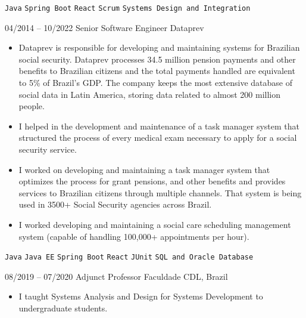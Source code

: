 \begin{entrylist}
{\begin{itemize}[noitemsep,topsep=0pt,parsep=0pt,partopsep=0pt, leftmargin=-1pt]
                \end{itemize} 
                \texttt{Java} \slashsep \texttt{Spring Boot} \slashsep \texttt{React} \slashsep \texttt{Scrum} \slashsep \texttt{Systems Design and Integration} 
        }

	\entry
        {04/2014 -- 10/2022}
		{Senior Software Engineer}
		{Dataprev}
		{
                \vspace{-10pt}
                \begin{itemize}[noitemsep,topsep=0pt,parsep=0pt,partopsep=0pt, leftmargin=-1pt]
                    \item Dataprev is responsible for developing and maintaining systems for Brazilian social security. Dataprev processes 34.5 million pension payments and other benefits to Brazilian citizens and the total payments handled are equivalent to 5\% of Brazil's GDP. The company keeps the most extensive database of social data in Latin America, storing data related to almost 200 million people.
                    \item I helped in the development and maintenance of a task manager system that structured the process of every medical exam necessary to apply for a social security service. 
                    \item I worked on developing and maintaining a task manager system that optimizes the process for grant pensions, and other benefits and provides services to Brazilian citizens through multiple channels. That system is being used in 3500+ Social Security agencies across Brazil. 
                    \item I worked developing and maintaining a social care scheduling management system (capable of handling 100,000+ appointments per hour).

                \end{itemize} 
                \texttt{Java} \slashsep \texttt{Java EE}  \slashsep \texttt{Spring Boot} \slashsep \texttt{React} \slashsep \texttt{JUnit} \slashsep \texttt{SQL and Oracle Database}
        }
	
	\entry
        {08/2019 -- 07/2020}
		{Adjunct Professor}
		{Faculdade CDL, Brazil}
		{
                \vspace{-10pt}
                    \begin{itemize}[noitemsep,topsep=0pt,parsep=0pt,partopsep=0pt, leftmargin=-1pt]
                        \item I taught Systems Analysis and Design for Systems Development to undergraduate students.
                    \end{itemize} 
            }


\end{entrylist}
